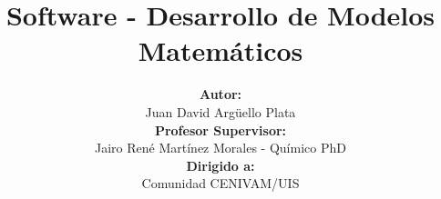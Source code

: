\documentclass[12]{beamer}
\title[Software Modelado Matemático]{\textbf{Software - Desarrollo de Modelos Matem\'aticos}}
\author[Juan David]{
\textbf{Autor:}\\
Juan David Argüello Plata\\
\textbf{Profesor Supervisor:}\\
Jairo René Martínez Morales - Químico PhD\\
\textbf{Dirigido a:}\\
Comunidad CENIVAM/UIS
}
\institute[UIS]{
	CENIVAM\\
	Universidad Industrial de Santander
}
\date{}
\begin{document}
\begin{frame}
\titlepage
\end{frame}














\end{document}
